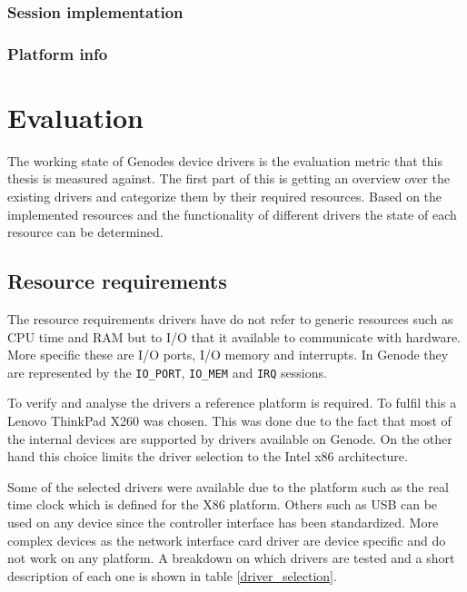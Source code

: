 \documentclass[
a4paper,
12pt,
notitlepage,
parskip=half,
DIV=11,
]{scrbook}
\begin{document}
		\subsection{Session implementation}
		
		\subsection{Platform info}
	
	\chapter{Evaluation}
	
		The working state of Genodes device drivers is the evaluation metric that this thesis is measured against.
		The first part of this is getting an overview over the existing drivers and categorize them by their required resources.
		Based on the implemented resources and the functionality of different drivers the state of each resource can be determined.
		
		\section{Resource requirements}
		
		The resource requirements drivers have do not refer to generic resources such as CPU time and RAM but to I/O that it available to communicate with hardware.
		More specific these are I/O ports, I/O memory and interrupts.
		In Genode they are represented by the \texttt{IO\_PORT}, \texttt{IO\_MEM} and \texttt{IRQ} sessions.
		
		To verify and analyse the drivers a reference platform is required.
		To fulfil this a Lenovo ThinkPad X260 was chosen.
		This was done due to the fact that most of the internal devices are supported by drivers available on Genode.
		On the other hand this choice limits the driver selection to the Intel x86 architecture.
		
		Some of the selected drivers were available due to the platform such as the real time clock which is defined for the X86 platform.
		Others such as USB can be used on any device since the controller interface has been standardized.
		More complex devices as the network interface card driver are device specific and do not work on any platform.
		A breakdown on which drivers are tested and a short description of each one is shown in table \ref{driver_selection}.
		
\end{document}
